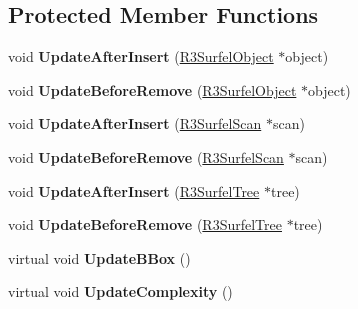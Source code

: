 \subsection*{Protected Member Functions}
\begin{DoxyCompactItemize}
\item 
void {\bfseries Update\+After\+Insert} (\hyperlink{class_r3_surfel_object}{R3\+Surfel\+Object} $\ast$object)\hypertarget{class_r3_surfel_node_a6fcfb673d890350d6e9e7090360b94a3}{}\label{class_r3_surfel_node_a6fcfb673d890350d6e9e7090360b94a3}

\item 
void {\bfseries Update\+Before\+Remove} (\hyperlink{class_r3_surfel_object}{R3\+Surfel\+Object} $\ast$object)\hypertarget{class_r3_surfel_node_a2bf702afbc3f134326a56f02fb3b7177}{}\label{class_r3_surfel_node_a2bf702afbc3f134326a56f02fb3b7177}

\item 
void {\bfseries Update\+After\+Insert} (\hyperlink{class_r3_surfel_scan}{R3\+Surfel\+Scan} $\ast$scan)\hypertarget{class_r3_surfel_node_a6ed2b7831c0c096fb6679a3760396ac9}{}\label{class_r3_surfel_node_a6ed2b7831c0c096fb6679a3760396ac9}

\item 
void {\bfseries Update\+Before\+Remove} (\hyperlink{class_r3_surfel_scan}{R3\+Surfel\+Scan} $\ast$scan)\hypertarget{class_r3_surfel_node_af86ca0d43248fb395620bafaec602e22}{}\label{class_r3_surfel_node_af86ca0d43248fb395620bafaec602e22}

\item 
void {\bfseries Update\+After\+Insert} (\hyperlink{class_r3_surfel_tree}{R3\+Surfel\+Tree} $\ast$tree)\hypertarget{class_r3_surfel_node_a82d578078d3c0d4089931b6828159412}{}\label{class_r3_surfel_node_a82d578078d3c0d4089931b6828159412}

\item 
void {\bfseries Update\+Before\+Remove} (\hyperlink{class_r3_surfel_tree}{R3\+Surfel\+Tree} $\ast$tree)\hypertarget{class_r3_surfel_node_ad8a9a0c3715e2aa16287374f7717ec46}{}\label{class_r3_surfel_node_ad8a9a0c3715e2aa16287374f7717ec46}

\item 
virtual void {\bfseries Update\+B\+Box} ()\hypertarget{class_r3_surfel_node_a7c78987bf8f2c4336c104c18de3965ad}{}\label{class_r3_surfel_node_a7c78987bf8f2c4336c104c18de3965ad}

\item 
virtual void {\bfseries Update\+Complexity} ()\hypertarget{class_r3_surfel_node_af828e93fe102ee91c35843dcd420a5c1}{}\label{class_r3_surfel_node_af828e93fe102ee91c35843dcd420a5c1}


\end{DoxyCompactItemize}
